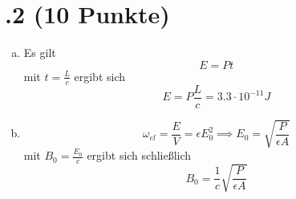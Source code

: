 \section*{\nr.2 \tittwo (10 Punkte)}
\begin{enumerate}[(a)]
\item Es gilt
\begin{equation}
  E=Pt
\end{equation}
mit $t=\frac{L}{c}$ ergibt sich
\begin{equation}
  E=P \frac{L}{c}=3.3\cdot 10^{-11}J
\end{equation}
\item 
\begin{equation}
  \omega_{el}=\frac{E}{V}=\epsilon E_0^2\implies E_0=\sqrt{\frac{P}{\epsilon A}}
\end{equation}
mit $B_0=\frac{E_0}{c}$ ergibt sich schließlich
\begin{equation}
  B_0 = \frac{1}{c}\sqrt{\frac{P}{\epsilon A}}
\end{equation}
\end{enumerate}